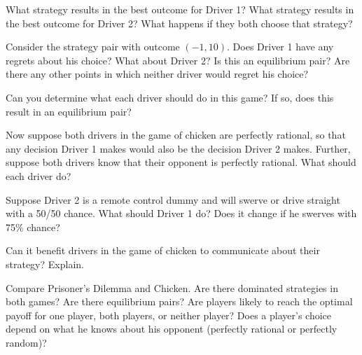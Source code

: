 \begin{xca}\label{E:Cbestoutcome}
What strategy results in the best outcome for Driver 1? What strategy results in the best outcome for Driver 2? What happens if they both choose that strategy?
\end{xca}

\begin{xca}\label{E:Cequilpairs}
Consider the strategy pair with outcome $(-1, 10)$. Does Driver 1 have any regrets about his choice? What about Driver 2? Is this an equilibrium pair? Are there any other points in which neither driver would regret his choice?
\end{xca}

\begin{xca}\label{E:Cbeststrat}
Can you determine what each driver should do in this game? If so, does this result in an equilibrium pair?
\end{xca}

\begin{xca}\label{E:Csamestrat}
Now suppose both drivers in the game of chicken are perfectly rational, so that any decision Driver 1 makes would also be the decision Driver 2 makes. Further, suppose both drivers know that their opponent is perfectly rational. What should each driver do?
\end{xca}

\begin{xca}\label{E:Crandom} Suppose Driver 2 is a remote control dummy and will swerve or drive straight with a 50/50 chance. What should Driver 1 do? Does it change if he swerves with 75\% chance?
\end{xca}

\begin{xca}\label{E:Ccommunicate}
Can it benefit drivers in the game of chicken to communicate about their strategy? Explain.
\end{xca}

\begin{xca}\label{E:comparePDC} 
Compare Prisoner's Dilemma and Chicken. Are there dominated strategies in both games? Are there equilibrium pairs? Are players likely to reach the optimal payoff for one player, both players, or neither player? Does a player's choice depend on what he knows about his opponent (perfectly rational or perfectly random)?
\end{xca}



